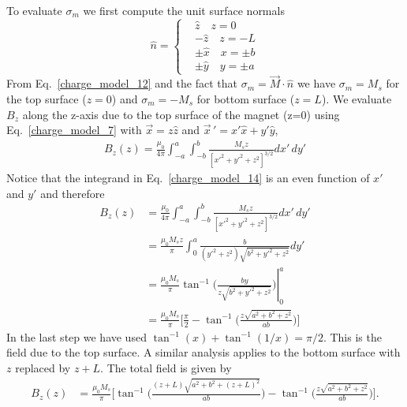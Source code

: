 \documentclass[12pt,a4paper,oneside]{book}
\begin{document}
\begin{onehalfspace}
\begin{example}
\begin{equation}
\end{equation} 
To evaluate $\sigma_m$ we first compute the unit surface normals
\begin{equation*}\label{}
\hat{n} = \left\lbrace 
	\begin{aligned}
		&\hat{z}\quad z=0 \\[6pt]	
		&-\hat{z}\quad z=-L \\[6pt]
		&\pm\hat{x}\quad x=\pm b \\[6pt]	
		&\pm\hat{y}\quad y=\pm a  
	\end{aligned}\right. 
\end{equation*} 
From Eq.~\eqref{charge_model_12} and the fact that $\sigma_m=\vec{M}\cdot\hat{n}$ we have $\sigma_m=M_s$ for the top surface ($z=0$) and $\sigma_m=-M_s$ for bottom surface ($z=L$). We evaluate $B_z$ along the z-axis due to the top surface of the magnet (z=0) using Eq.~\eqref{charge_model_7} with $\vec{x}=z\hat{z}$ and $\vec{x}\,'=x'\hat{x}+y'\hat{y}$,
\begin{equation}\label{charge_model_14}
	\begin{aligned}
			B_z(z) = \frac{\mu_0}{4\pi}\int_{-a}^{a}\int_{-b}^{b}\frac{M_s z}{[{x'}^2+{y'}^2+{z}^2]^{3/2}}dx'\,dy'
	\end{aligned}
\end{equation} 
Notice that the integrand in Eq.~\eqref{charge_model_14} is an even function of $x'$ and $y'$ and therefore
\begin{equation*}\label{}
	\begin{aligned}
		B_z(z) &= \frac{\mu_0}{4\pi}\int_{-a}^{a}\int_{-b}^{b}\frac{M_s z}{[{x'}^2+{y'}^2+{z}^2]^{3/2}}dx'\,dy' \\[6pt]
		&=\frac{\mu_0M_s z}{\pi}\int_{0}^{a}\frac{b}{({y'}^2+{z}^2)\sqrt{b^2+{y'}^2+z^2}}dy' \\[6pt]
		&=\frac{\mu_0M_s}{\pi}\tan^{-1}\left. \Bigg(\frac{by}{z\sqrt{b^2+{y'}^2+z^2}}\Bigg)\right|_0^a \\[6pt]
		&=\frac{\mu_0M_s}{\pi}\Biggl[\frac{\pi}{2}-\tan^{-1}\Bigg(\frac{z\sqrt{a^2+b^2+z^2}}{ab}\Bigg)\Biggr]
	\end{aligned}
\end{equation*} 
In the last step we have used $\tan^{-1}(x) + \tan^{-1}(1/x)=\pi/2$. This is the field due to the top surface. A similar analysis applies to the bottom surface with $z$ replaced by $z+L$. The total field is given by
\begin{equation}\label{charge_model_15}
	\begin{aligned}
		B_z(z) &= \frac{\mu_0M_s}{\pi}\Biggl[\tan^{-1}\Bigg(\frac{(z+L)\sqrt{a^2+b^2+(z+L)^2}}{ab}\Bigg)-\tan^{-1}\Bigg(\frac{z\sqrt{a^2+b^2+z^2}}{ab}\Bigg)\Biggr].
	\end{aligned}
\end{equation} 
\end{example}


\end{onehalfspace}
\end{document}

